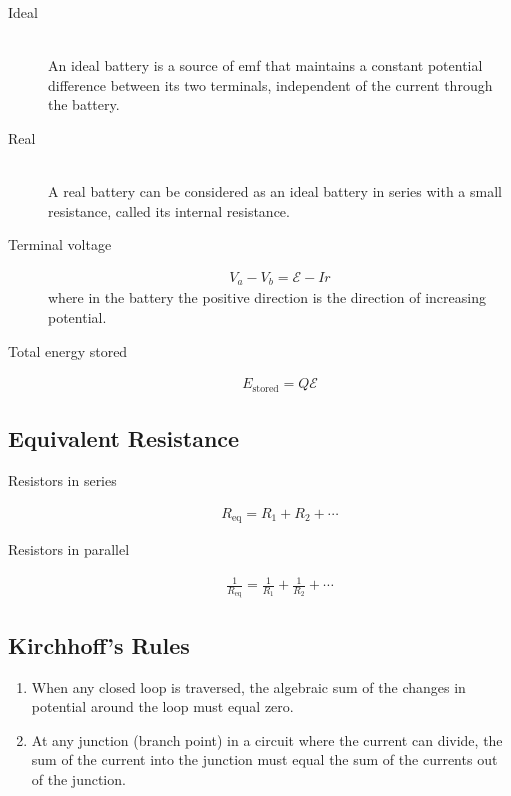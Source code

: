 \documentclass[../main.tex]{subfiles}
\begin{document}
\begin{description}
  \item[Ideal] \hfill \\
    An ideal battery is a source of emf that maintains a constant potential
    difference between its two terminals, independent of the current through
    the battery.
  \item[Real] \hfill \\
    A real battery can be considered as an ideal battery in series with a small
    resistance, called its internal resistance.
  \item[Terminal voltage]
    \begin{align}
      V_a - V_b = \mathcal{E} - Ir
    \end{align}
    where in the battery the positive direction is the direction of increasing
    potential.
  \item[Total energy stored]
    \begin{align}
      E_{\text{stored}} = Q\mathcal{E}
    \end{align}
\end{description}

\subsection{Equivalent Resistance}
\label{sub:equivalent_resistance}

\begin{description}
  \item[Resistors in series]
    \begin{align}
      R_{\text{eq}} = R_1 + R_2 + \cdots
    \end{align}
  \item[Resistors in parallel]
    \begin{align}
      \frac{1}{R_{\text{eq}}} = \frac{1}{R_1} + \frac{1}{R_2} + \cdots
    \end{align}
\end{description}

\subsection{Kirchhoff's Rules}
\label{sub:kirchhoff_s_rules}

\begin{enumerate}
  \item When any closed loop is traversed, the algebraic sum of the changes in
    potential around the loop must equal zero.
  \item At any junction (branch point)  in a circuit where the current can
    divide, the sum of the current into the junction must equal the sum of the
    currents out of the junction.
\end{enumerate}
\end{document}
